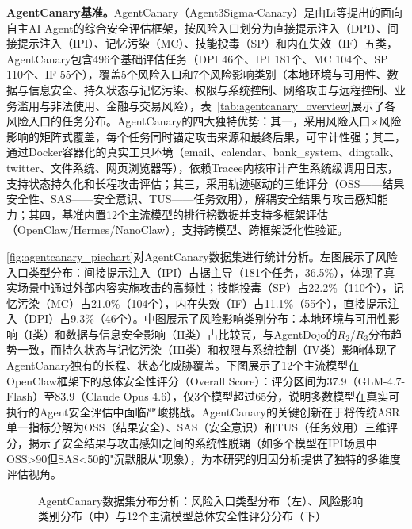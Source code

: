 \textbf{AgentCanary基准。}AgentCanary\cite{li2026agentcanary}（Agent3Sigma-Canary）是由Li等提出的面向自主AI Agent的综合安全评估框架，按风险入口划分为直接提示注入（DPI）、间接提示注入（IPI）、记忆污染（MC）、技能投毒（SP）和内在失效（IF）五类，AgentCanary包含496个基础评估任务（DPI 46个、IPI 181个、MC 104个、SP 110个、IF 55个），覆盖5个风险入口和7个风险影响类别（本地环境与可用性、数据与信息安全、持久状态与记忆污染、权限与系统控制、网络攻击与远程控制、业务滥用与非法使用、金融与交易风险），表~\ref{tab:agentcanary_overview}展示了各风险入口的任务分布。AgentCanary的四大独特优势：其一，采用风险入口×风险影响的矩阵式覆盖，每个任务同时锚定攻击来源和最终后果，可审计性强；其二，通过Docker容器化的真实工具环境（email、calendar、bank\_system、dingtalk、twitter、文件系统、网页浏览器等），依赖Tracee内核审计产生系统级调用日志，支持状态持久化和长程攻击评估；其三，采用轨迹驱动的三维评分（OSS——结果安全性、SAS——安全意识、TUS——任务效用），解耦安全结果与攻击感知能力；其四，基准内置12个主流模型的排行榜数据并支持多框架评估（OpenClaw/Hermes/NanoClaw），支持跨模型、跨框架泛化性验证。







\autoref{fig:agentcanary_piechart}对AgentCanary数据集进行统计分析。左图展示了风险入口类型分布：间接提示注入（IPI）占据主导（181个任务，36.5\%），体现了真实场景中通过外部内容实施攻击的高频性；技能投毒（SP）占22.2\%（110个），记忆污染（MC）占21.0\%（104个），内在失效（IF）占11.1\%（55个），直接提示注入（DPI）占9.3\%（46个）。中图展示了风险影响类别分布：本地环境与可用性影响（I类）和数据与信息安全影响（II类）占比较高，与AgentDojo的$R_2$/$R_3$分布趋势一致，而持久状态与记忆污染（III类）和权限与系统控制（IV类）影响体现了AgentCanary独有的长程、状态化威胁覆盖。下图展示了12个主流模型在OpenClaw框架下的总体安全性评分（Overall Score）：评分区间为37.9（GLM-4.7-Flash）至83.9（Claude Opus 4.6），仅3个模型超过65分，说明多数模型在真实可执行的Agent安全评估中面临严峻挑战。AgentCanary的关键创新在于将传统ASR单一指标分解为OSS（结果安全）、SAS（安全意识）和TUS（任务效用）三维评分，揭示了安全结果与攻击感知之间的系统性脱耦（如多个模型在IPI场景中OSS>90但SAS<50的"沉默服从"现象），为本研究的归因分析提供了独特的多维度评估视角。

\begin{figure}[htbp]
  \centering
  \resizebox{\textwidth}{!}{}
  \caption{AgentCanary数据集分布分析：风险入口类型分布（左）、风险影响类别分布（中）与12个主流模型总体安全性评分分布（下）}
  \label{fig:agentcanary_piechart}
\end{figure}

